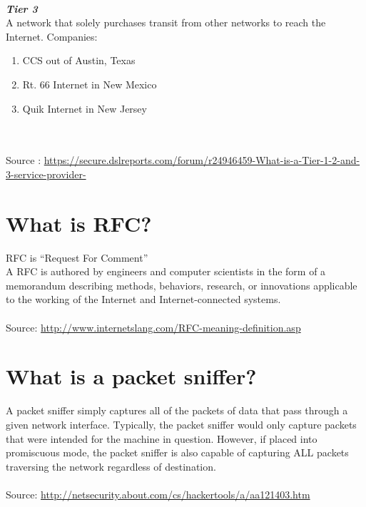 \documentclass[20pt]{article}
\begin{document}
\\\textbf{\emph{Tier 3}}
\\A network that solely purchases transit from other networks to reach the Internet.
Companies:
\begin{enumerate}
	\\\item{CCS out of Austin, Texas}
	\\\item{ Rt. 66 Internet in New Mexico }
	\\\item{Quik Internet in New Jersey }
\end{enumerate}
\\\\Source : 
\url{https://secure.dslreports.com/forum/r24946459-What-is-a-Tier-1-2-and-3-service-provider-}
\section{What is RFC?}
 
RFC is ``Request For Comment''
\\A RFC is authored by engineers and computer scientists in the form of a memorandum describing methods, behaviors, research, or innovations applicable to the working of the Internet and Internet-connected systems.
\\\\Source: \url{http://www.internetslang.com/RFC-meaning-definition.asp}
\section{What is a packet sniffer?}
A packet sniffer simply captures all of the packets of data that pass through a given network interface. Typically, the packet sniffer would only capture packets that were intended for the machine in question. However, if placed into promiscuous mode, the packet sniffer is also capable of capturing ALL packets traversing the network regardless of destination. 
\\\\Source: \url{http://netsecurity.about.com/cs/hackertools/a/aa121403.htm}
\end{document}
